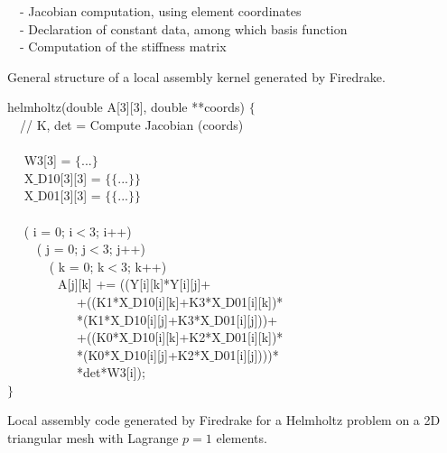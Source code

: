 \documentclass[conference]{IEEEtran}
\begin{document}
\begin{algorithm}[t]
\small
{}
~~- Jacobian computation, using element coordinates \\
~~- Declaration of constant data, among which basis function\\
~~- Computation of the stiffness matrix
\caption{General structure of a local assembly kernel generated by Firedrake.}
\label{code:general-structure}
\end{algorithm}

\begin{algorithm}[t]
\small
{} helmholtz(double A[3][3], double **coords) $\lbrace$\\
~~// K, det = Compute Jacobian (coords) \\
~~\\
~~ W3[3] = $\lbrace$...$\rbrace$\\
~~ X$\_$D10[3][3] = $\lbrace\lbrace$...$\rbrace\rbrace$\\
~~ X$\_$D01[3][3] = $\lbrace\lbrace$...$\rbrace\rbrace$\\
~~\\
~~ ( i = 0; i$<$3; i++) \\
~~~~ ( j = 0; j$<$3; j++) \\
~~~~~~ ( k = 0; k$<$3; k++) \\
~~~~~~~~A[j][k] += ((Y[i][k]*Y[i][j]+\\
~~~~~~~~~~~+((K1*X$\_$D10[i][k]+K3*X$\_$D01[i][k])*\\
~~~~~~~~~~~*(K1*X$\_$D10[i][j]+K3*X$\_$D01[i][j]))+\\
~~~~~~~~~~~+((K0*X$\_$D10[i][k]+K2*X$\_$D01[i][k])*\\
~~~~~~~~~~~*(K0*X$\_$D10[i][j]+K2*X$\_$D01[i][j])))*\\
~~~~~~~~~~~*det*W3[i]);\\
$\rbrace$
\caption{Local assembly code generated by Firedrake for a Helmholtz problem on a 2D triangular mesh with Lagrange $p=1$ elements.}
\label{code:helmholtz}
\end{algorithm}
\end{document}
